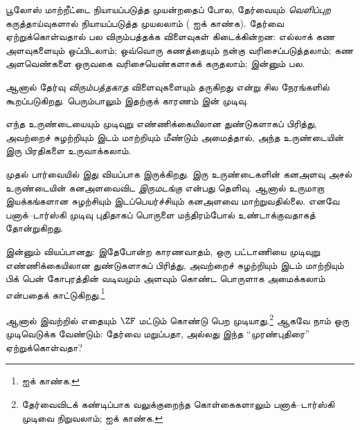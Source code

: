 \documentclass[../../../include/open-logic-section]{subfiles}
\begin{document}

பூலோஸ் மாற்றீட்டை நியாயப்படுத்த முயன்றதைப் போல,
தேர்வையும் \emph{வெளிப்புற} கருத்தாய்வுகளால் நியாயப்படுத்த
முயலலாம் ( ஐக் காண்க).
தேர்வை ஏற்றுக்கொள்வதால் பல விரும்பத்தக்க விளைவுகள்
கிடைக்கின்றன: எல்லாக் கண அளவுகளையும் ஒப்பிடலாம்;
ஒவ்வொரு கணத்தையும் நன்கு வரிசைப்படுத்தலாம்; கண அளவெண்களை
ஒருவகை வரிசையெண்களாகக் கருதலாம்; இன்னும் பல.

ஆனால் தேர்வு \emph{விரும்பத்தகாத} விளைவுகளையும் தருகிறது
என்று சில நேரங்களில் கூறப்படுகிறது. பெரும்பாலும் இதற்குக்
காரணம் \cite{BanachTarski1924} இன் முடிவு.

\begin{thm}[பனாக்--டார்ஸ்கி முரண்புதிர் ($\ZFC$ இல்)]
எந்த உருண்டையையும் முடிவுறு எண்ணிக்கையிலான துண்டுகளாகப்
பிரித்து, அவற்றைச் சுழற்றியும் இடம் மாற்றியும் மீண்டும்
அமைத்தால், அந்த உருண்டையின் இரு பிரதிகளை உருவாக்கலாம்.
\end{thm}
\noindent

முதல் பார்வையில் இது வியப்பாக இருக்கிறது. இரு
உருண்டைகளின் கனஅளவு அசல் உருண்டையின் கனஅளவைவிட
\emph{இருமடங்கு} என்பது தெளிவு. ஆனால் உருமாறா
இயக்கங்களான சுழற்சியும் இடப்பெயர்ச்சியும் கனஅளவை
மாற்றுவதில்லை. எனவே பனாக்--டார்ஸ்கி முடிவு புதிதாகப்
பொருளை மந்திரம்போல் உண்டாக்குவதாகத் தோன்றுகிறது.

இன்னும் வியப்பானது: இதேபோன்ற காரணவாதம், ஒரு
பட்டாணியை முடிவுறு எண்ணிக்கையிலான துண்டுகளாகப் பிரித்து,
அவற்றைச் சுழற்றியும் இடம் மாற்றியும் பிக் பென் கோபுரத்தின்
வடிவமும் அளவும் கொண்ட பொருளாக அமைக்கலாம் என்பதைக்
காட்டுகிறது.\footnote{\citet[Theorem 3.12]{Wagon2016} ஐக் காண்க.}

ஆனால் இவற்றில் எதையும் $\ZF$ மட்டும் கொண்டு பெற
முடியாது.\footnote{தேர்வைவிடக் கண்டிப்பாக வலுக்குறைந்த
கொள்கைகளாலும் பனாக்--டார்ஸ்கி முடிவை நிறுவலாம்;
\citet[303]{Wagon2016} ஐக் காண்க.} ஆகவே நாம் ஒரு
முடிவெடுக்க வேண்டும்: தேர்வை மறுப்பதா, அல்லது இந்த
``முரண்புதிரை'' ஏற்றுக்கொள்வதா?
\end{document}
